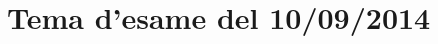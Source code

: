 \documentclass[main.tex]{subfiles}
\begin{document}
\section{Tema d'esame del 10/09/2014}


\clearpage

%
\end{document}
